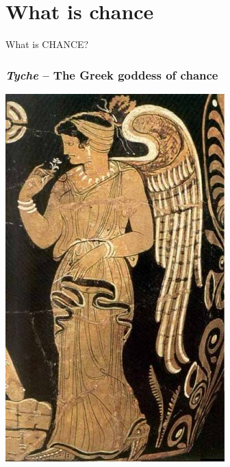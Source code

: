\documentclass[9pt]{beamer}
\begin{document}
\begin{frame}[noframenumbering] \titlepage
\end{frame}
\begin{frame} \tableofcontents\end{frame}
\section{What is chance}%
\begin{frame}[fragile] %
\begin{center}
  \huge
  What is CHANCE?
\end{center}
\end{frame}
\begin{frame}[fragile,t] %
  \frametitle{{\it Tyche} -- The Greek goddess of chance}
  \begin{center}
    \includegraphics[scale=0.35]{./figs/Tyche.jpg} \quad

\end{center}
\end{frame}
\end{document}
